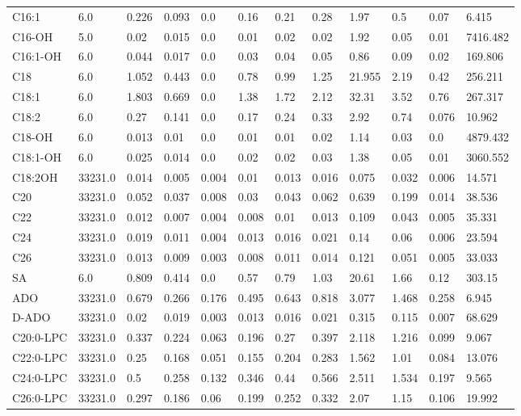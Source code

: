 \begin{tabular}{llllllllllll}
C16:1 & 6.0 & 0.226 & 0.093 & 0.0 & 0.16 & 0.21 & 0.28 & 1.97 & 0.5 & 0.07 & 6.415 \\
C16-OH & 5.0 & 0.02 & 0.015 & 0.0 & 0.01 & 0.02 & 0.02 & 1.92 & 0.05 & 0.01 & 7416.482 \\
C16:1-OH & 6.0 & 0.044 & 0.017 & 0.0 & 0.03 & 0.04 & 0.05 & 0.86 & 0.09 & 0.02 & 169.806 \\
C18 & 6.0 & 1.052 & 0.443 & 0.0 & 0.78 & 0.99 & 1.25 & 21.955 & 2.19 & 0.42 & 256.211 \\
C18:1 & 6.0 & 1.803 & 0.669 & 0.0 & 1.38 & 1.72 & 2.12 & 32.31 & 3.52 & 0.76 & 267.317 \\
C18:2 & 6.0 & 0.27 & 0.141 & 0.0 & 0.17 & 0.24 & 0.33 & 2.92 & 0.74 & 0.076 & 10.962 \\
C18-OH & 6.0 & 0.013 & 0.01 & 0.0 & 0.01 & 0.01 & 0.02 & 1.14 & 0.03 & 0.0 & 4879.432 \\
C18:1-OH & 6.0 & 0.025 & 0.014 & 0.0 & 0.02 & 0.02 & 0.03 & 1.38 & 0.05 & 0.01 & 3060.552 \\
C18:2OH & 33231.0 & 0.014 & 0.005 & 0.004 & 0.01 & 0.013 & 0.016 & 0.075 & 0.032 & 0.006 & 14.571 \\
C20 & 33231.0 & 0.052 & 0.037 & 0.008 & 0.03 & 0.043 & 0.062 & 0.639 & 0.199 & 0.014 & 38.536 \\
C22 & 33231.0 & 0.012 & 0.007 & 0.004 & 0.008 & 0.01 & 0.013 & 0.109 & 0.043 & 0.005 & 35.331 \\
C24 & 33231.0 & 0.019 & 0.011 & 0.004 & 0.013 & 0.016 & 0.021 & 0.14 & 0.06 & 0.006 & 23.594 \\
C26 & 33231.0 & 0.013 & 0.009 & 0.003 & 0.008 & 0.011 & 0.014 & 0.121 & 0.051 & 0.005 & 33.033 \\
SA & 6.0 & 0.809 & 0.414 & 0.0 & 0.57 & 0.79 & 1.03 & 20.61 & 1.66 & 0.12 & 303.15 \\
ADO & 33231.0 & 0.679 & 0.266 & 0.176 & 0.495 & 0.643 & 0.818 & 3.077 & 1.468 & 0.258 & 6.945 \\
D-ADO & 33231.0 & 0.02 & 0.019 & 0.003 & 0.013 & 0.016 & 0.021 & 0.315 & 0.115 & 0.007 & 68.629 \\
C20:0-LPC & 33231.0 & 0.337 & 0.224 & 0.063 & 0.196 & 0.27 & 0.397 & 2.118 & 1.216 & 0.099 & 9.067 \\
C22:0-LPC & 33231.0 & 0.25 & 0.168 & 0.051 & 0.155 & 0.204 & 0.283 & 1.562 & 1.01 & 0.084 & 13.076 \\
C24:0-LPC & 33231.0 & 0.5 & 0.258 & 0.132 & 0.346 & 0.44 & 0.566 & 2.511 & 1.534 & 0.197 & 9.565 \\
C26:0-LPC & 33231.0 & 0.297 & 0.186 & 0.06 & 0.199 & 0.252 & 0.332 & 2.07 & 1.15 & 0.106 & 19.992 \\

\end{tabular}
